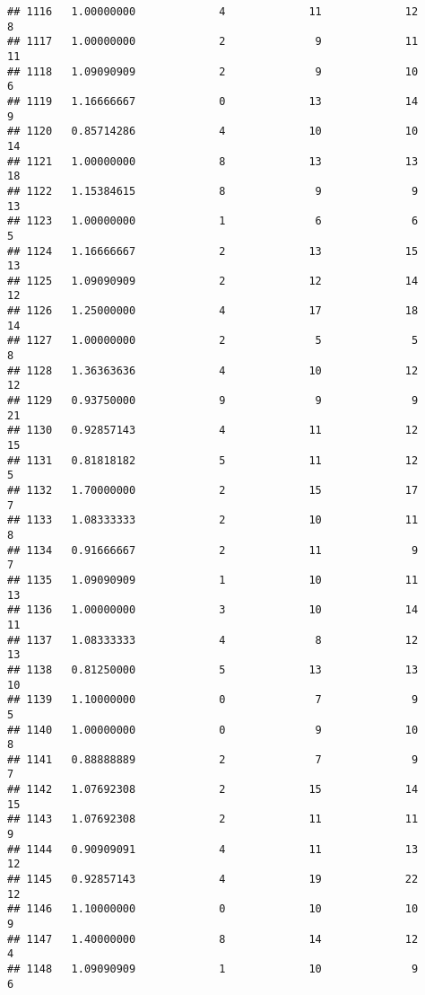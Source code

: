 \documentclass[
]{article}
\begin{document}
\begin{verbatim}
## 1116   1.00000000             4             11             12              8
## 1117   1.00000000             2              9             11             11
## 1118   1.09090909             2              9             10              6
## 1119   1.16666667             0             13             14              9
## 1120   0.85714286             4             10             10             14
## 1121   1.00000000             8             13             13             18
## 1122   1.15384615             8              9              9             13
## 1123   1.00000000             1              6              6              5
## 1124   1.16666667             2             13             15             13
## 1125   1.09090909             2             12             14             12
## 1126   1.25000000             4             17             18             14
## 1127   1.00000000             2              5              5              8
## 1128   1.36363636             4             10             12             12
## 1129   0.93750000             9              9              9             21
## 1130   0.92857143             4             11             12             15
## 1131   0.81818182             5             11             12              5
## 1132   1.70000000             2             15             17              7
## 1133   1.08333333             2             10             11              8
## 1134   0.91666667             2             11              9              7
## 1135   1.09090909             1             10             11             13
## 1136   1.00000000             3             10             14             11
## 1137   1.08333333             4              8             12             13
## 1138   0.81250000             5             13             13             10
## 1139   1.10000000             0              7              9              5
## 1140   1.00000000             0              9             10              8
## 1141   0.88888889             2              7              9              7
## 1142   1.07692308             2             15             14             15
## 1143   1.07692308             2             11             11              9
## 1144   0.90909091             4             11             13             12
## 1145   0.92857143             4             19             22             12
## 1146   1.10000000             0             10             10              9
## 1147   1.40000000             8             14             12              4
## 1148   1.09090909             1             10              9              6

\end{verbatim}
\end{document}
